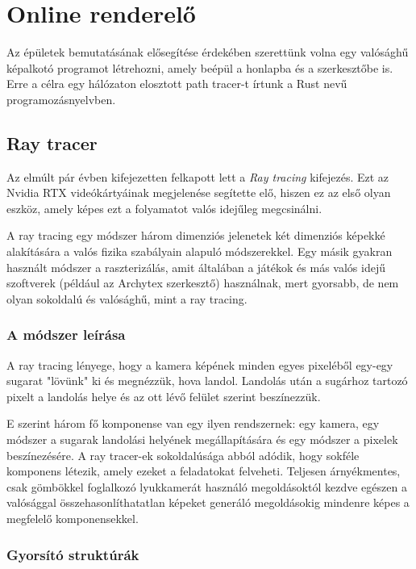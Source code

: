\section{Online renderelő}

Az épületek bemutatásának elősegítése érdekében szerettünk volna egy valósághű képalkotó programot létrehozni, amely beépül a honlapba és a szerkesztőbe is. Erre a célra egy hálózaton elosztott path tracer-t írtunk a Rust nevű programozásnyelvben.

\subsection{Ray tracer}
Az elmúlt pár évben kifejezetten felkapott lett a \emph{Ray tracing} kifejezés. Ezt az Nvidia RTX videókártyáinak megjelenése segítette elő, hiszen ez az első olyan eszköz, amely képes ezt a folyamatot valós idejűleg megcsinálni.

A ray tracing egy módszer három dimenziós jelenetek két dimenziós képekké alakítására a valós fizika szabályain alapuló módszerekkel. Egy másik gyakran használt módszer a raszterizálás, amit általában a játékok és más valós idejű szoftverek (például az Archytex szerkesztő) használnak, mert gyorsabb, de nem olyan sokoldalú és valósághű, mint a ray tracing.

\subsubsection{A módszer leírása}
A ray tracing lényege, hogy a kamera képének minden egyes pixeléből egy-egy sugarat "lövünk" ki és megnézzük, hova landol. Landolás után a sugárhoz tartozó pixelt a landolás helye és az ott lévő felület szerint beszínezzük.

E szerint három fő komponense van egy ilyen rendszernek: egy kamera, egy módszer a sugarak landolási helyének megállapítására és egy módszer a pixelek beszínezésére. A ray tracer-ek sokoldalúsága abból adódik, hogy sokféle komponens létezik, amely ezeket a feladatokat felveheti. Teljesen árnyékmentes, csak gömbökkel foglalkozó lyukkamerát használó megoldásoktól kezdve egészen a valósággal összehasonlíthatatlan képeket generáló megoldásokig mindenre képes a megfelelő komponensekkel.

\subsubsection{Gyorsító struktúrák}

